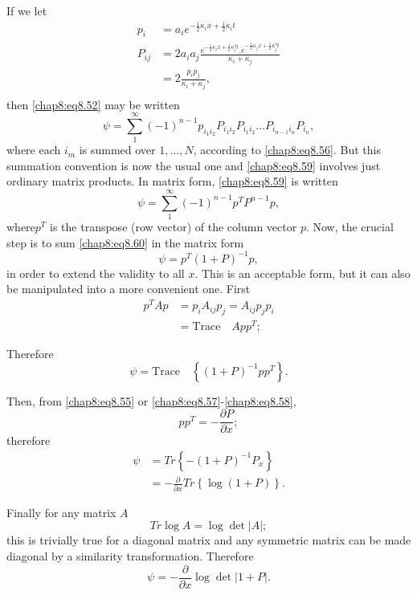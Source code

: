 If we let 
\begin{align*}
p_i &= a_i e^{-\frac{1}{2}\kappa_ix+\frac{1}{2}\kappa_it}\\
P_{ij} &= 2a_ia_j\frac{e^{-\frac{1}{2}\kappa_ix+\frac{1}{2}\kappa_i^3t}.e^{-\frac{1}{2} \kappa_jx+\frac{1}{2}\kappa_j^3t}}{\kappa_i+\kappa_j} \tag{8.57}\label{chap8:eq8.57}\\
&= 2\frac{p_ip_j}{\kappa_i+\kappa_j}, \tag{8.58}\label{chap8:eq8.58}\\
\end{align*}
then \eqref{chap8:eq8.52} may be written 
\begin{equation}
\psi=\sum\limits_1^\infty(-1)^{n-1}p_{i_1 i_2}P_{i_1 i_2}P_{i_1 i_2}\ldots P_{i_{n-1}i_n} P_{i_n},\tag{8.59}\label{chap8:eq8.59}
\end{equation}
where each $i_m$ is summed over $1,\ldots,N$, according to \eqref{chap8:eq8.56}. But this summation convention is now the usual one and \eqref{chap8:eq8.59} involves just ordinary matrix products. In matrix form, \eqref{chap8:eq8.59} is written 
\begin{equation}
\psi=\sum\limits_1^\infty(-1)^{n-1} p^TP^{n-1}p,\tag{8.60}\label{chap8:eq8.60}
\end{equation}
where\pageoriginale $p^T$ is the transpose (row vector) of the column vector $p$. Now, the crucial step is to sum \eqref{chap8:eq8.60} in the matrix form 
\begin{equation}
\psi=p^T(1+P)^{-1}p,\tag{8.61}\label{chap8:eq8.61}
\end{equation}
in order to extend the validity to all $x$. This is an acceptable form, but it can also be manipulated into a more convenient one. First 
\begin{align*}
p^T Ap &= p_iA_{ij}p_j =A_{ij}p_jp_i\\
&= \text{Trace}\quad App^T;
\end{align*}

Therefore 
$$
\psi =\text{Trace}\quad\left\{(1+P)^{-1}pp^T\right\}.
$$

Then, from \eqref{chap8:eq8.55} or \eqref{chap8:eq8.57}-\eqref{chap8:eq8.58}, 
$$
pp^T=-\frac{\partial P}{\partial x};
$$
therefore
\begin{align*}
\psi &= Tr\left\{-(1+P)^{-1}P_x\right\}\\
& = -\frac{\partial}{\partial x}Tr\left\{\log(1+P)\right\}.
\end{align*}

Finally for any matrix $A$
$$
Tr\log A=\log\det|A|;
$$
this is trivially true for a diagonal matrix and any symmetric matrix can be made diagonal by a similarity transformation. Therefore
\begin{equation}
\psi =-\frac{\partial}{\partial x}\log\det |1+P|.\tag{8.61}\label{chap8:eq8.61'}
\end{equation}

